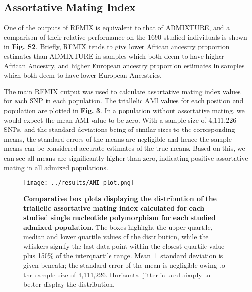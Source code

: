 \documentclass[11pt]{article}
\begin{document}
\subsection{Assortative Mating Index}





One of the outputs of RFMIX is equivalent to that of ADMIXTURE, and a comparison of their relative performance on the 1690 studied individuals is shown in \textbf{Fig. S2}. Briefly, RFMIX tends to give lower African ancestry proportion estimates than ADMIXTURE in samples which both deem to have higher African Ancestry, and higher European ancestry proportion estimates in samples which both deem to have lower European Ancestries. 

The main RFMIX output was used to calculate assortative mating index values for each SNP in each population. The triallelic AMI values for each position and population are plotted in \textbf{Fig. 3}. In a population without assortative mating, we would expect the mean AMI value to be zero. With a sample size of 4,111,226 SNPs, and the standard deviations being of similar sizes to the corresponding means, the standard errors of the means are negligible and hence the sample means can be considered accurate estimates of the true means. Based on this, we can see all means are significantly higher than zero, indicating positive assortative mating in all admixed populations.



\vspace{3mm}
\begin{figure}[htb!]%
    \centering
    \texttt{[image: ../results/AMI\_plot.png]} 
    \vspace{.1cm}
    \caption{\textbf{
        Comparative box plots displaying the distribution of the triallelic assortative mating index calculated for each studied single nucleotide polymorphism for each studied admixed population.
    }
        The boxes highlight the upper quartile, median and lower quartile values of the distribution, while the whiskers signify the last data point within the closest quartile value plus 150\% of the interquartile range. Mean ± standard deviation is given beneath; the standard error of the mean is negligible owing to the sample size of 4,111,226. Horizontal jitter is used simply to better display the distribution.
    }
\end{figure}
\end{document}
